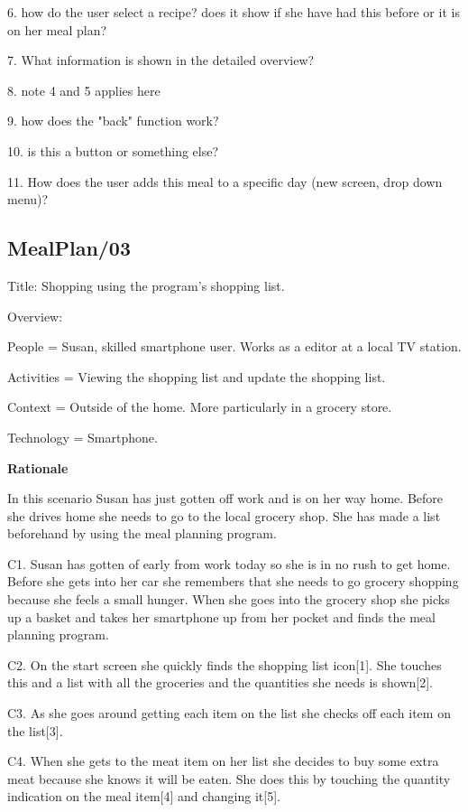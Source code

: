 6. how do the user select a recipe? does it show if she have had this before or it is on her meal 
plan?

7. What information is shown in the detailed overview?

8. note 4 and 5 applies here

9. how does the "back" function work?

10. is this a button or something else?

11. How does the user adds this meal to a specific day (new screen, drop down menu)?

\subsection{MealPlan/03} \label{MealPlan03}

Title: Shopping using the program's shopping list.

Overview:

	People = Susan, skilled smartphone user. Works as a editor at a local TV station. 
	
	Activities = Viewing the shopping list and update the shopping list.

	Context = Outside of the home. More particularly in a grocery store.

	Technology = Smartphone.
	
\textbf{Rationale}

In this scenario Susan has just gotten off work and is on her way home. Before she drives home she needs to go to the local grocery shop. She has made a list beforehand by using the meal planning program.

	C1. Susan has gotten of early from work today so she is in no rush to get home. Before she gets into her car she remembers that she needs to go grocery shopping because she feels a small hunger. When she goes into the grocery shop she picks up a basket and takes her smartphone up from her pocket and finds the meal planning program.
	
	C2. On the start screen she quickly finds the shopping list icon[1]. She touches this and a list with all the groceries and the quantities she needs is shown[2].
	
	C3. As she goes around getting each item on the list she checks off each item on the list[3].
	
	C4. When she gets to the meat item on her list she decides to buy some extra meat because she knows it will be eaten. She does this by touching the quantity indication on the meal item[4] and changing it[5]. 	
	
